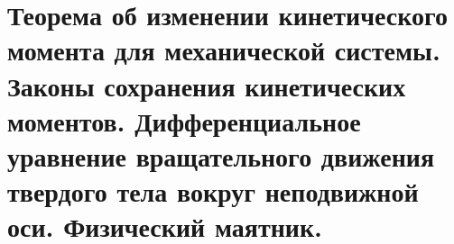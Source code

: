 \chapter{Теорема об изменении кинетического момента для механической системы.
Законы сохранения кинетических моментов. Дифференциальное уравнение
вращательного движения твердого тела вокруг неподвижной оси. Физический
маятник.}

\newpage
